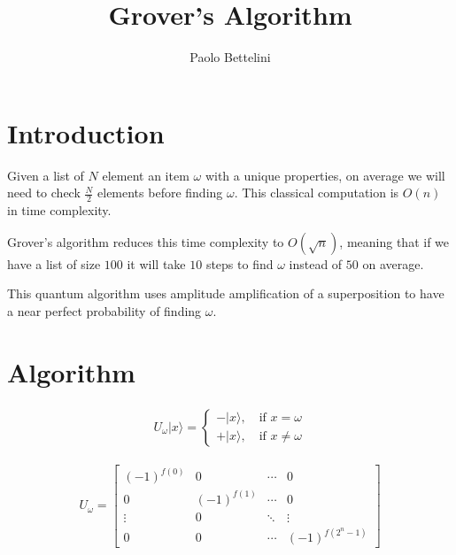 \documentclass{article}
\title{Grover's Algorithm}
\author{Paolo Bettelini}
\date{}
\begin{document}
\maketitle
\tableofcontents
\pagebreak

\section{Introduction}

Given a list of \(N\) element an item \(\omega\) with a unique properties, on average we will need to check \(\frac{N}{2}\) elements before finding \(\omega\).
This classical computation is \(O(n)\) in time complexity.

Grover's algorithm reduces this time complexity to \(O(\sqrt{n})\), meaning that if we have a list of size \(100\) it will take \(10\) steps to find \(\omega\) instead of \(50\) on average.

This quantum algorithm uses amplitude amplification of a superposition to have a near perfect probability of finding \(\omega\).

\pagebreak

\section{Algorithm}

\begin{align*}
    U_\omega|x\rangle=
    \begin{cases}
        -|x\rangle,\quad \text{if } x=\omega \\
        +|x\rangle,\quad \text{if } x\neq\omega
    \end{cases}
\end{align*}

\begin{align*}
    U_\omega=
    \begin{bmatrix}
        (-1)^{f(0)} & 0 & \cdots & 0 \\
        0 & (-1)^{f(1)} & \cdots & 0 \\
        \vdots & 0 & \ddots & \vdots \\
        0 & 0 & \cdots & (-1)^{f(2^n-1)}
    \end{bmatrix}
\end{align*}
\end{document}
